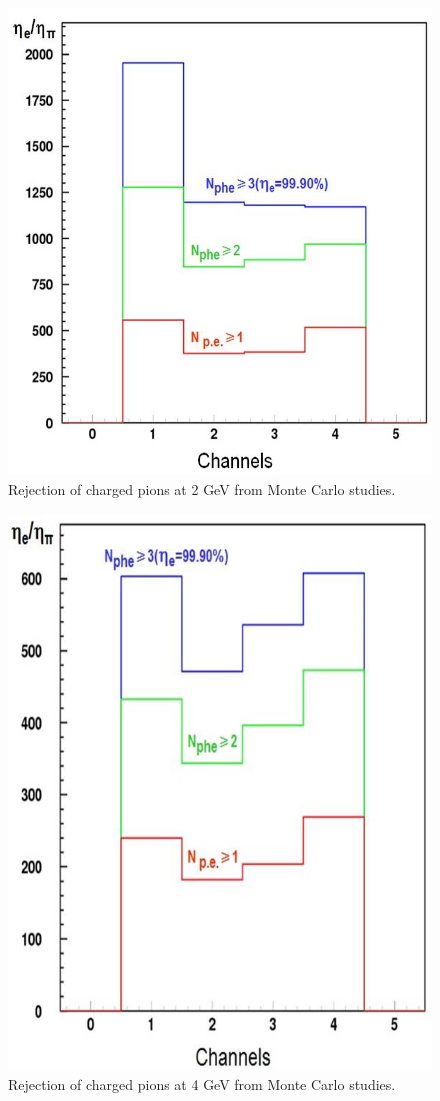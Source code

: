 \begin{figure}[!ht]
    \centering
    \includegraphics[width=1.0\linewidth,trim={0.0cm 0.0cm 0.0cm 0.0cm},clip]{images/Pion_rejection_2GeV.jpg}
    \caption{Rejection of charged pions at 2 GeV from Monte Carlo studies.}
    \label{fig:Pion_rejection_2GeV}
\end{figure}

\begin{figure}[!ht]
    \centering
    \includegraphics[width=1.0\linewidth,trim={0.0cm 0.0cm 0.0cm 0.0cm},clip]{images/Pion_rejection_4GeV.jpg}
    \caption{Rejection of charged pions at 4 GeV from Monte Carlo studies.}
    \label{fig:Pion_rejection_4GeV}
\end{figure}

